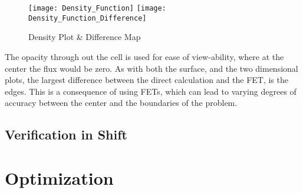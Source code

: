 \documentclass[10tma4paper]{article}
\begin{document}
\begin{figure}[!htbp]
	\caption{Density Plot \& Difference Map}
	\begin{center}
		\texttt{[image: Density\_Function]}
		\texttt{[image: Density\_Function\_Difference]}
	\end{center}
	\label{Density Plot}
\end{figure}
The opacity through out the cell is used for ease of view-ability, where at the center the flux would be zero. As with both the surface, and the two dimensional plots, the largest difference between the direct calculation and the FET, is the edges. This is a consequence of using FETs, which can lead to varying degrees of accuracy between the center and the boundaries of the problem.

\subsection{Verification in Shift}\label{P2}

\section{Optimization}\label{optimization}
\end{document}
